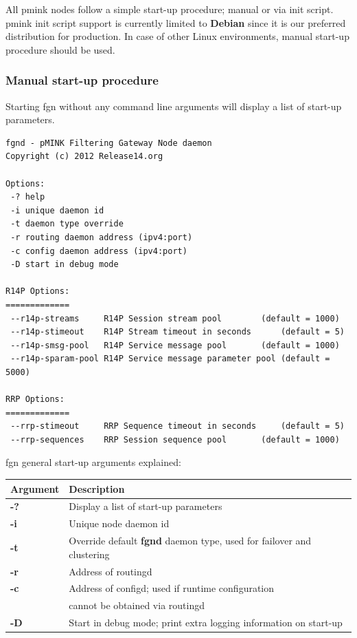 \documentclass[a4paper,latin]{paper}
\begin{document}
All \acrshort{pmink} nodes follow a simple start-up procedure; manual or via init script. \acrshort{pmink} init script support is currently 
limited to \textbf{Debian} since it is our preferred distribution for production. In case of other Linux environments, manual start-up procedure
should be used.\\

\subsubsection{Manual start-up procedure}
Starting \acrfull{fgn} without any command line arguments will display a list of start-up parameters.
\begin{lstlisting}[style=BashInputStyle]
fgnd - pMINK Filtering Gateway Node daemon
Copyright (c) 2012 Release14.org

Options:
 -?	help
 -i	unique daemon id
 -t	daemon type override
 -r	routing daemon address (ipv4:port)
 -c	config daemon address (ipv4:port)
 -D	start in debug mode

R14P Options:
=============
 --r14p-streams		R14P Session stream pool		(default = 1000)
 --r14p-stimeout	R14P Stream timeout in seconds		(default = 5)
 --r14p-smsg-pool	R14P Service message pool		(default = 1000)
 --r14p-sparam-pool	R14P Service message parameter pool	(default = 5000)

RRP Options:
=============
 --rrp-stimeout		RRP Sequence timeout in seconds		(default = 5)
 --rrp-sequences	RRP Session sequence pool		(default = 1000)

\end{lstlisting}
\clearpage
\noindent{}\acrfull{fgn} general start-up arguments explained:\\
\begin{tabularx}{\textwidth}{ | l | X | }
	\hline
	Argument 		& Description \\
	\hline
	\textbf{-?}		& Display a list of start-up parameters \\
	\textbf{-i}		& Unique \gls{node} \gls{daemon} id \\
	\textbf{-t}		& Override default \textbf{fgnd} \gls{daemon} type, used for failover and clustering \\
	\textbf{-r}		& Address of \acrfull{routingd} \\
	\textbf{-c}		& Address of \acrfull{configd}; used if runtime configuration \\
				& cannot be obtained via \acrfull{routingd} \\
	\textbf{-D}		& Start in debug mode; print extra logging information on start-up \\
	\hline
\end{tabularx}\\\\
\end{document}
